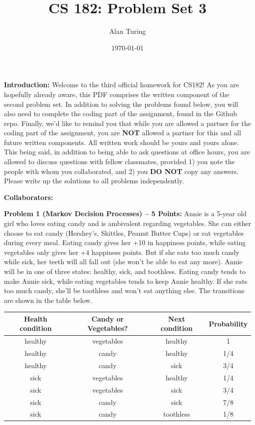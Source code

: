 \documentclass[]{article}
\title{CS 182: Problem Set 3}
\author{Alan Turing}
\date{\today}
\begin{document}
\maketitle

\textbf{Introduction:}  
Welcome to the third official homework for CS182!  As you are hopefully already aware, this PDF comprises the written component of the second problem set.  In addition to solving the problems found below, you will also need to complete the coding part of the assignment, found in the Github repo.  Finally, we'd like to remind you that while you are allowed a partner for the coding part of the assignment, you are \textbf{NOT} allowed a partner for this and all future written components.  All written work should be yours and yours alone.  This being said, in addition to being able to ask questions at office hours, you are allowed to discuss questions with fellow classmates, provided 1) you note the people with whom you collaborated, and 2) you \textbf{DO NOT} copy any answers.  Please write up the solutions to all problems independently.

\bigskip
\textbf{Collaborators:}

\clearpage

\textbf{Problem 1 (Markov Decision Processes) -- 5 Points:}
Annie is a 5-year old girl who loves eating candy and is ambivalent regarding vegetables. She can either choose to eat candy (Hershey's, Skittles, Peanut Butter Cups) or eat vegetables during every meal. Eating candy gives her +10 in happiness points, while eating vegetables only gives her +4 happiness points. But if she eats too much candy while sick, her teeth will all fall out (she won't be able to eat any more). Annie will be in one of three states: healthy, sick, and toothless. Eating candy tends to make Annie sick, while eating vegetables tends to keep Annie healthy. If she eats too much candy, she'll be toothless and won't eat anything else. The transitions are shown in the table below.

\begin{table}[htb]
\centering
    \begin{tabular}{|c|c|c|c|}
      \hline
        Health condition &	Candy or Vegetables? &	Next condition & Probability \\\hline
        healthy &	vegetables &	healthy & 	1 \\\hline
        healthy &	candy &	healthy & 	1/4 \\\hline
        healthy &	candy &	sick & 	3/4 \\\hline
        sick &	vegetables &	healthy & 	1/4 \\\hline
        sick &	vegetables &	sick & 	3/4 \\\hline
        sick &	candy &	sick & 	7/8 \\\hline
        sick &	candy &	toothless & 	1/8 \\\hline
    \end{tabular}
\end{table}
  
\end{document}
